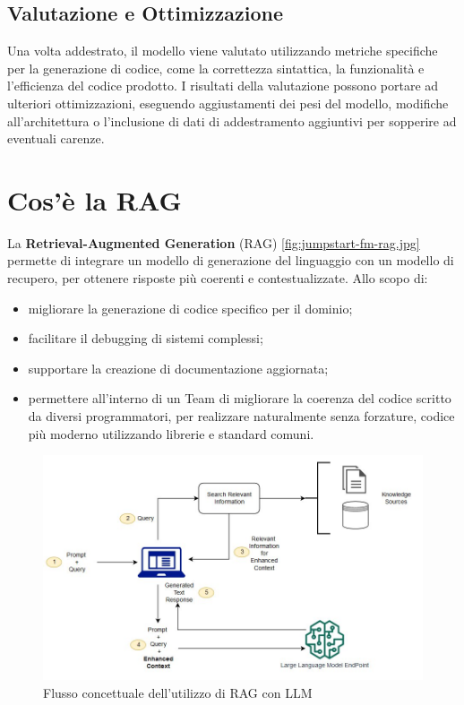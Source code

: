 \documentclass[12pt,a4paper,openright,twoside]{book}
\begin{document}
\section{Valutazione e Ottimizzazione}
Una volta addestrato, il modello viene valutato utilizzando metriche specifiche per la generazione di codice, come la correttezza sintattica, la funzionalità e l'efficienza del codice prodotto. I risultati della valutazione possono portare ad ulteriori ottimizzazioni,
eseguendo aggiustamenti dei pesi del modello, modifiche all'architettura o l'inclusione di dati di addestramento aggiuntivi per sopperire ad eventuali carenze.

\chapter{Cos'è la RAG}
La \textbf{Retrieval-Augmented Generation} (RAG) \cref{fig:jumpstart-fm-rag.jpg} permette di integrare un modello di generazione del linguaggio con un modello di recupero, per ottenere risposte più coerenti e contestualizzate.
Allo scopo di:
\begin{itemize}
    \item migliorare la generazione di codice specifico per il dominio;
    \item facilitare il debugging di sistemi complessi;
    \item supportare la creazione di documentazione aggiornata;
    \item permettere all'interno di un Team di migliorare la coerenza del codice scritto da diversi programmatori, per realizzare naturalmente senza forzature, codice più moderno utilizzando librerie e standard comuni.
\end{itemize}


\begin{figure}
    \centering
    \includegraphics[width=.8\linewidth]{figures/jumpstart-fm-rag.jpg}
    \caption{Flusso concettuale dell'utilizzo di RAG con LLM}
    \label{fig:random-image}
\end{figure}
\end{document}
